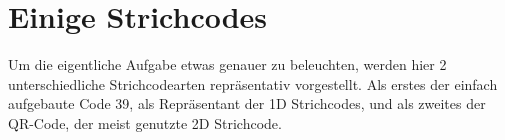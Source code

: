 \section{Einige Strichcodes}
\writtenby{\dcauthornameriren}%
Um die eigentliche Aufgabe etwas genauer zu beleuchten, werden hier 2 unterschied\-liche Strichcodearten repräsentativ vorgestellt. Als erstes der einfach aufgebaute Code 39, als Repräsentant der 1D Strichcodes, und als zweites der QR-Code, der meist genutzte 2D Strichcode.



